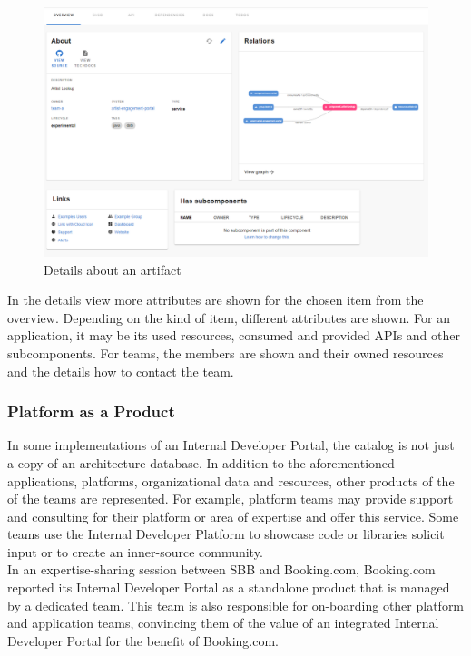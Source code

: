 \documentclass[a4paper,12pt]{article}
\begin{document}
    \begin{figure}
        \includegraphics[width=\linewidth]{backstage_item_details}
        \caption{Details about an artifact}
        \label{fig:portaldetails}
    \end{figure}
    In the details view more attributes are shown for the chosen item from the overview.
    Depending on the kind of item, different attributes are shown.
    For an application, it may be its used resources, consumed and provided APIs and other subcomponents.
    For teams, the members are shown and their owned resources and the details how to contact the team.

    \subsubsection{Platform as a Product}
    \label{sssec:paap}
    In some implementations of an Internal Developer Portal, the catalog is not just a copy of an architecture database.
    In addition to the aforementioned applications, platforms, organizational data and resources, other products of the
    of the teams are represented.
    For example, platform teams may provide support and consulting for their platform or area of expertise and offer
    this service.
    Some teams use the Internal Developer Platform to showcase code or libraries solicit input or to create an
    inner-source community.\\
    In an expertise-sharing session between SBB and Booking.com, Booking.com reported\parencite{bookingcom} its Internal
    Developer Portal as a standalone product that is managed by a dedicated team.
    This team is also responsible for on-boarding other platform and application teams, convincing them of the
    value of an integrated Internal Developer Portal for the benefit of Booking.com.
\end{document}
